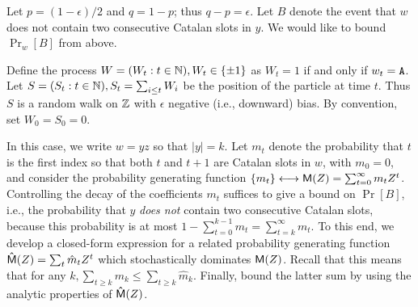   Let $p = (1 - \epsilon)/2$ and $q = 1 - p$; 
  thus $q - p = \epsilon$. 
  Let $B$ denote the event that 
  $w$ does not contain two consecutive Catalan slots in $y$. 
  We would like to bound $\Pr_w[B]$ from above.

  Define the process $W = (W_t : t \in \mathbb{N}), W_t \in \{\pm 1\}$ as $W_t = 1$ if and only if $w_t = \mathtt{A}$. 
  Let $S = (S_t : t \in \mathbb{N}), S_t = \sum_{i \leq t} W_i$ be the position of the particle at time $t$. 
  Thus $S$ is a random walk on $\mathbb{Z}$ with $\epsilon$ negative (i.e., downward) bias. 
  By convention, set $W_0 = S_0 = 0$. 

  In this case, we write $w = yz$ so that $|y| = k$. 
  Let $m_t$ denote the probability that 
  $t$ is the first index so that both $t$ and $t+1$ are Catalan slots in $w$, 
  with $m_0 = 0$, and consider the probability generating function 
  $\{m_t\} \longleftrightarrow \mathsf{M}(Z) = \sum_{t = 0}^\infty m_t Z^t$. 
  Controlling the decay of the coefficients $m_t$ suffices
  to give a bound on $\Pr[B]$, i.e., 
  the probability that 
  $y$ \emph{does not} contain two consecutive Catalan slots, 
  because this probability is at most 
  $
    1 - \sum_{t =0}^{k-1} m_t 
      = \sum_{t = k}^\infty m_t
  $. 
  To this end, we develop a
  closed-form expression for a related probability generating function
  $\mathsf{\hat{M}}(Z) = \sum_t \hat{m}_t Z^t$ which stochastically
  dominates $\mathsf{M}(Z)$. 
  Recall that this means that for any $k, \sum_{t \geq k} m_k \leq \sum_{t \geq k} \hat{m}_k$. 
  Finally, bound the latter sum  
  by using the analytic properties of $\mathsf{\hat{M}}(Z)$. 


